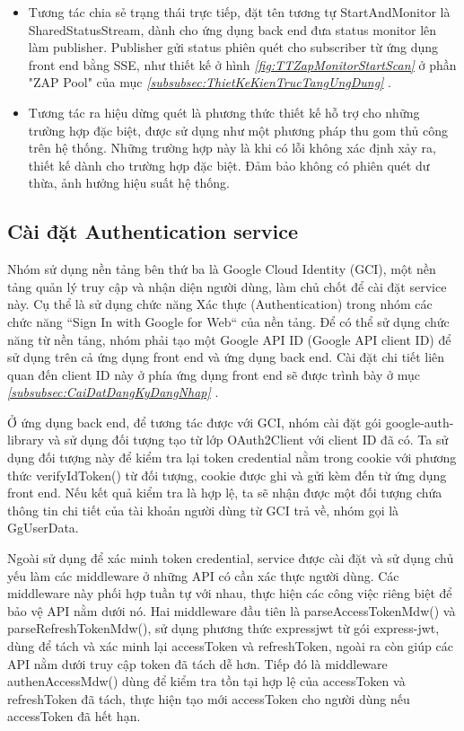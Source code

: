 \begin{itemize}
  \item Tương tác chia sẻ trạng thái trực tiếp, đặt tên tương tự StartAndMonitor là SharedStatusStream, dành cho ứng dụng back end đưa status monitor lên làm publisher.
        Publisher gửi status phiên quét cho subscriber từ ứng dụng front end bằng SSE, như thiết kế ở hình \textit{\ref{fig:TTZapMonitorStartScan} } ở phần "ZAP Pool" của mục \textit{\ref{subsubsec:ThietKeKienTrucTangUngDung} }.
  \item Tương tác ra hiệu dừng quét là phương thức thiết kế hỗ trợ cho những trường hợp đặc biệt, được sử dụng như một phương pháp thu gom thủ công trên hệ thống. Những trường hợp này là khi có lỗi không xác định xảy ra, thiết kế dành cho trường hợp đặc biệt. Đảm bảo không có phiên quét dư thừa, ảnh hưởng hiệu suất hệ thống.
\end{itemize}

\subsection{Cài đặt Authentication service}

\tab Nhóm sử dụng nền tảng bên thứ ba là Google Cloud Identity (GCI), một nền tảng quản lý truy cập và nhận diện người dùng, làm chủ chốt để cài đặt service này.
Cụ thể là sử dụng chức năng Xác thực (Authentication) trong nhóm các chức năng “Sign In with Google for Web“ của nền tảng.
Để có thể sử dụng chức năng từ nền tảng, nhóm phải tạo một Google API ID (Google API client ID) để sử dụng trên cả ứng dụng front end và ứng dụng back end.
Cài đặt chi tiết liên quan đến client ID này ở phía ứng dụng front end sẽ được trình bày ở mục \textit{\ref{subsubsec:CaiDatDangKyDangNhap} }.
\par

Ở ứng dụng back end, để tương tác được với GCI, nhóm cài đặt gói google-auth-library và sử dụng đối tượng tạo từ lớp OAuth2Client với client ID đã có. Ta sử dụng đối tượng này để kiểm tra lại token credential nằm trong cookie với phương thức verifyIdToken() từ đối tượng, cookie được ghi và gửi kèm đến từ ứng dụng front end. Nếu kết quả kiểm tra là hợp lệ, ta sẽ nhận được một đối tượng chứa thông tin chi tiết của tài khoản người dùng từ GCI trả về, nhóm gọi là GgUserData.
\par

Ngoài sử dụng để xác minh token credential, service được cài đặt và sử dụng chủ yếu làm các middleware ở những API có cần xác thực người dùng.
Các middleware này phối hợp tuần tự với nhau, thực hiện các công việc riêng biệt để bảo vệ API nằm dưới nó.
Hai middleware đầu tiên là parseAccessTokenMdw() và parseRefreshTokenMdw(), sử dụng phương thức expressjwt từ gói express-jwt, dùng để tách và xác minh lại accessToken và refreshToken, ngoài ra còn giúp các API nằm dưới truy cập token đã tách dễ hơn.
Tiếp đó là middleware authenAccessMdw() dùng để kiểm tra tồn tại hợp lệ của accessToken và refreshToken đã tách, thực hiện tạo mới accessToken cho người dùng nếu accessToken đã hết hạn.

